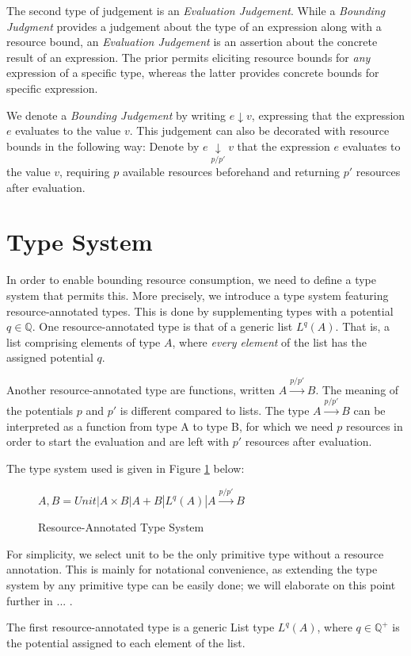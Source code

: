  The second type of judgement is an \emph{Evaluation Judgement}. While a \emph{Bounding Judgment} provides a judgement about the type of an expression along with a resource bound, an \emph{Evaluation Judgement} is an assertion about the concrete result of an expression. The prior permits eliciting resource bounds for \emph{any} expression of a specific type, whereas the latter provides concrete bounds for specific expression. 

 We denote a \emph{Bounding Judgement} by writing \(e \downarrow v\), expressing that the expression \(e\) evaluates to the value \(v\). This judgement can also be decorated with resource bounds in the following way: Denote by \(e \underset{p/p'}{\downarrow} v\) that the expression \(e\) evaluates to the value \(v\), requiring \(p\) available resources beforehand and returning \(p'\) resources after evaluation.


\section{Type System} \label{chap:type-system}
In order to enable bounding resource consumption, we need to define a type system that permits this. More precisely, we introduce a type system featuring resource-annotated types. This is done by supplementing types with a potential \(q \in \mathbb{Q}\). 
One resource-annotated type is that of a generic list \(L^q(A)\). That is, a list comprising elements of type \(A\), where \emph{every element} of the list has the assigned potential \(q\).

Another resource-annotated type are functions, written \(A \xrightarrow{p/p'} B\). The meaning of the potentials \(p\) and \(p'\) is different compared to lists. The type \(A \xrightarrow{p/p'} B\) can be interpreted as a function from type A to type B, for which we need \(p\) resources in order to start the evaluation and are left with \(p'\) resources after evaluation. 

The type system used is given in Figure \ref{fig:type-system} below:

\begin{figure}[H]
\centering
\(A,B = Unit | A \times B | A + B | L^q(A) | A \xrightarrow{p/p'} B\)
\caption{Resource-Annotated Type System}
\label{fig:type-system}
\end{figure}

For simplicity, we select unit to be the only primitive type without a resource annotation. This is mainly for notational convenience, as extending the type system by any primitive type can be easily done; we will elaborate on this point further in ... .

The first resource-annotated type is a generic List type \(L^q(A)\), where \(q \in \mathbb{Q}^+\) is the potential assigned to each element of the list. 
